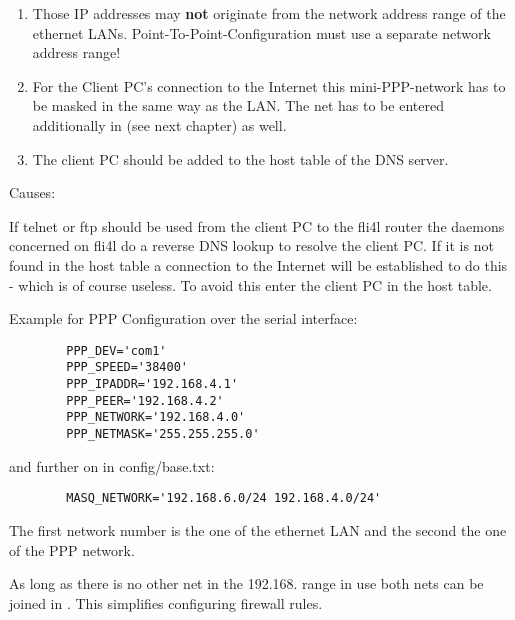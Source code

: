 \begin{description}
    \begin{enumerate}
    \item Those IP addresses may \textbf{not} originate from the network address range of the 
      ethernet LANs. Point-To-Point-Configuration must use a separate network address range!

    
     \item  For the Client PC's connection to the Internet this mini-PPP-network has to be 
       masked in the same way as the LAN. The net has to be entered additionally in 
        (see next chapter) as well.

    
     \item  The client PC should be added to the host table of the DNS server.
    \end{enumerate}

       Causes:

       If telnet or ftp should be used from the client PC to the fli4l router 
       the daemons concerned on fli4l do a reverse DNS lookup to resolve the 
       client PC. If it is not found in the host table a connection to the Internet 
       will be established to do this - which is of course useless. To avoid
       this enter the client PC in the host table.

       Example for PPP Configuration over the serial interface:

\begin{example}
\begin{verbatim}
        PPP_DEV='com1'
        PPP_SPEED='38400'
        PPP_IPADDR='192.168.4.1'
        PPP_PEER='192.168.4.2'
        PPP_NETWORK='192.168.4.0'
        PPP_NETMASK='255.255.255.0'
\end{verbatim}
\end{example}

           and further on in config/base.txt:

\begin{example}
\begin{verbatim}
        MASQ_NETWORK='192.168.6.0/24 192.168.4.0/24'
\end{verbatim}
\end{example}
           
           The first network number is the one of the ethernet LAN and the 
           second the one of the PPP network.
           
           As long as there is no other net in the 192.168. range in use 
           both nets can be joined in . 
           This simplifies configuring firewall rules.


\end{description}
